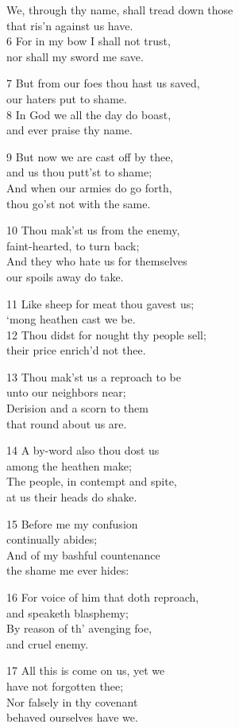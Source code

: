 We, through thy name, shall tread down those\\
that ris’n against us have.\\
6 For in my bow I shall not trust,\\
nor shall my sword me save.

7 But from our foes thou hast us saved,\\
our haters put to shame.\\
8 In God we all the day do boast,\\
and ever praise thy name.

9 But now we are cast off by thee,\\
and us thou putt’st to shame;\\
And when our armies do go forth,\\
thou go’st not with the same.

10 Thou mak’st us from the enemy,\\
faint-hearted, to turn back;\\
And they who hate us for themselves\\
our spoils away do take.

11 Like sheep for meat thou gavest us;\\
‘mong heathen cast we be.\\
12 Thou didst for nought thy people sell;\\
their price enrich’d not thee.

13 Thou mak’st us a reproach to be\\
unto our neighbors near;\\
Derision and a scorn to them\\
that round about us are.

14 A by-word also thou dost us\\
among the heathen make;\\
The people, in contempt and spite,\\
at us their heads do shake.

15 Before me my confusion\\
continually abides;\\
And of my bashful countenance\\
the shame me ever hides:

16 For voice of him that doth reproach,\\
and speaketh blasphemy;\\
By reason of th’ avenging foe,\\
and cruel enemy.

17 All this is come on us, yet we\\
have not forgotten thee;\\
Nor falsely in thy covenant\\
behaved ourselves have we.

